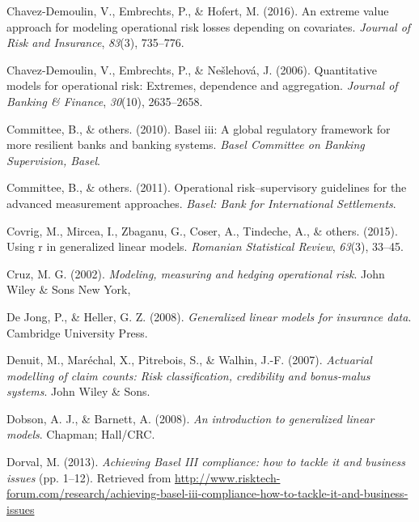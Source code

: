 \documentclass{DissertateUSU}
\begin{document}
\leavevmode\hypertarget{ref-chavez2016extreme}{}%
Chavez-Demoulin, V., Embrechts, P., \& Hofert, M. (2016). An extreme
value approach for modeling operational risk losses depending on
covariates. \emph{Journal of Risk and Insurance}, \emph{83}(3),
735--776.

\leavevmode\hypertarget{ref-chavez2006quantitative}{}%
Chavez-Demoulin, V., Embrechts, P., \& Nešlehová, J. (2006).
Quantitative models for operational risk: Extremes, dependence and
aggregation. \emph{Journal of Banking \& Finance}, \emph{30}(10),
2635--2658.

\leavevmode\hypertarget{ref-basel2010basel}{}%
Committee, B., \& others. (2010). Basel iii: A global regulatory
framework for more resilient banks and banking systems. \emph{Basel
Committee on Banking Supervision, Basel}.

\leavevmode\hypertarget{ref-basel2011operational}{}%
Committee, B., \& others. (2011). Operational risk--supervisory
guidelines for the advanced measurement approaches. \emph{Basel: Bank
for International Settlements}.

\leavevmode\hypertarget{ref-covrig2015using}{}%
Covrig, M., Mircea, I., Zbaganu, G., Coser, A., Tindeche, A., \& others.
(2015). Using r in generalized linear models. \emph{Romanian Statistical
Review}, \emph{63}(3), 33--45.

\leavevmode\hypertarget{ref-cruz2002modeling}{}%
Cruz, M. G. (2002). \emph{Modeling, measuring and hedging operational
risk}. John Wiley \& Sons New York,

\leavevmode\hypertarget{ref-de2008generalized}{}%
De Jong, P., \& Heller, G. Z. (2008). \emph{Generalized linear models
for insurance data}. Cambridge University Press.

\leavevmode\hypertarget{ref-denuit2007actuarial}{}%
Denuit, M., Maréchal, X., Pitrebois, S., \& Walhin, J.-F. (2007).
\emph{Actuarial modelling of claim counts: Risk classification,
credibility and bonus-malus systems}. John Wiley \& Sons.

\leavevmode\hypertarget{ref-dobson2008introduction}{}%
Dobson, A. J., \& Barnett, A. (2008). \emph{An introduction to
generalized linear models}. Chapman; Hall/CRC.

\leavevmode\hypertarget{ref-mysis2013}{}%
Dorval, M. (2013). \emph{Achieving Basel III compliance: how to tackle
it and business issues} (pp. 1--12). Retrieved from
\url{http://www.risktech-forum.com/research/achieving-basel-iii-compliance-how-to-tackle-it-and-business-issues}
\end{document}
